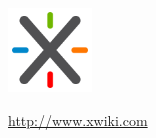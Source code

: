 \documentclass{learnpad}
\begin{document}
\begin{figure}[!htp]
	\centering
	\includegraphics[width=6em,keepaspectratio]{figures/xwiki.png}\par
	\url{http://www.xwiki.com}
\end{figure}







% 
% 
\end{document}
